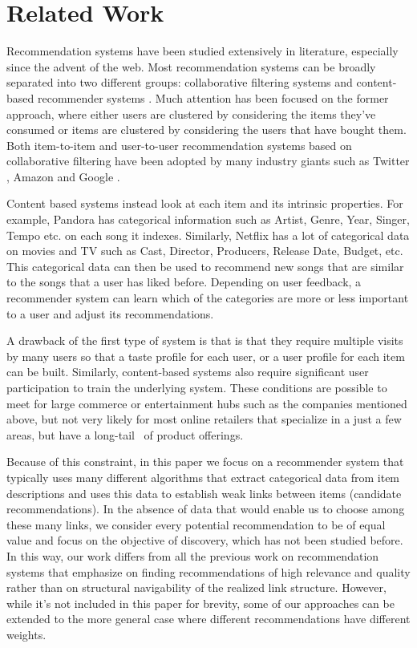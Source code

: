 \section{Related Work}

Recommendation systems have been studied extensively in literature, especially since the advent of the web. Most recommendation systems can be broadly separated into two different groups: collaborative filtering systems and content-based recommender systems \cite{almazro2010survey}. Much attention has been focused on the former approach, where either users are clustered by considering the items they've consumed or items are clustered by considering the users that have bought them. Both item-to-item and user-to-user recommendation systems based on collaborative filtering have been adopted by many industry giants such as Twitter \cite{twitter-collab-filtering}, Amazon \cite{amazon-collab-filtering} and Google \cite{google-collab-filtering}.  \vs

Content based systems instead look at each item and its intrinsic properties. For example, Pandora has categorical information such as Artist, Genre, Year, Singer, Tempo etc. on each song it indexes. Similarly, Netflix has a lot of categorical data on movies and TV such as Cast, Director, Producers, Release Date, Budget, etc. This categorical data can then be used to recommend new songs that are similar to the songs that a user has liked before. Depending on user feedback, a recommender system can learn which of the categories are more or less important to a user and adjust its recommendations. \vs

A drawback of the first type of system is that is that they require multiple visits by many users so that a taste profile for each user, or a user profile for each item can be built. 
Similarly, content-based systems also require significant user participation to train the underlying system. These conditions are possible to meet for large commerce or entertainment hubs such as the companies mentioned above, but not very likely for most online retailers that specialize in a just a few areas, but have a long-tail~\cite{Anderson2006} of product offerings. \vs

Because of this constraint, in this paper we focus on a recommender system that typically uses many different algorithms that extract categorical data from item descriptions and uses this data to establish weak links between items (candidate recommendations). In the absence of data that would enable us to choose among these many links, we consider every potential recommendation to be of equal value and focus on the objective of discovery, which has not been studied before. In this way, our work differs from all the previous work on recommendation systems that emphasize on finding recommendations of high relevance and quality rather than on structural navigability of the realized link structure. However, while it's not included in this paper for brevity, some of our approaches can be extended to the more general case where different recommendations have different weights. \vs

